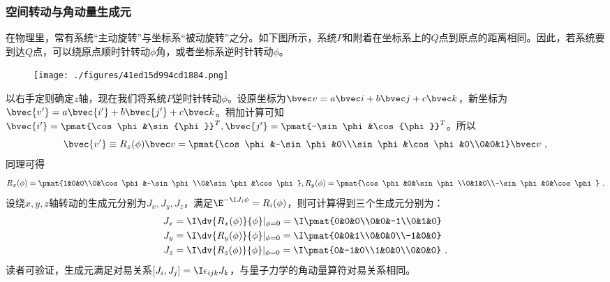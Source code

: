 
\begin{issues}
\issueMissDepend
\issueTODO
\end{issues}

\subsubsection{空间转动与角动量生成元}
在物理里，常有系统“主动旋转”与坐标系“被动旋转”之分。如下图所示，系统$P$和附着在坐标系上的$Q$点到原点的距离相同。因此，若系统要到达$Q$点，可以绕原点顺时针转动$\phi$角，或者坐标系逆时针转动$\phi$。
\begin{figure}[ht]
\centering
\texttt{[image: ./figures/41ed15d994cd1884.png]}
\caption{} \label{fig_spinqm_1}
\end{figure}
以右手定则确定$z$轴，现在我们将系统$P$逆时针转动$\phi$。设原坐标为$\bvec v=a\bvec i+b\bvec j+c\bvec k$，新坐标为$\bvec {v'}=a\bvec {i'}+b\bvec {j'}+c\bvec k$。稍加计算可知$\bvec {i'}=\pmat{\cos \phi &\sin {\phi}}^T,\bvec {j'}=\pmat{-\sin \phi &\cos {\phi}}^T$。所以
\begin{equation}
\bvec{v'}\equiv R_z(\phi)\bvec v=\pmat{\cos\phi&-\sin\phi&0\\\sin\phi&\cos \phi&0\\0&0&1}\bvec v~,
\end{equation}
同理可得
\begin{equation}
R_x(\phi)=\pmat {1&0&0\\0&\cos\phi&-\sin\phi\\0&\sin\phi&\cos\phi},R_y(\phi)=\pmat {\cos\phi&0&\sin\phi\\0&1&0\\-\sin\phi&0&\cos\phi}~.
\end{equation}
设绕$x,y,z$轴转动的生成元分别为$J_x,J_y,J_z$，满足$\E^{-\I J_i\phi}=R_i(\phi)$，则可计算得到三个生成元分别为：
\begin{equation}
\begin{aligned}
J_x&=\I \dv{R_x(\phi)}{\phi}|_{\phi=0}=\I \pmat{0&0&0\\0&0&-1\\0&1&0}\\
J_y&=\I \dv{R_y(\phi)}{\phi}|_{\phi=0}=\I\pmat{0&0&1\\0&0&0\\-1&0&0}\\
J_z&=\I \dv{R_z(\phi)}{\phi}|_{\phi=0}=\I\pmat{0&-1&0\\1&0&0\\0&0&0}~.
\end{aligned}
\end{equation}
读者可验证，生成元满足对易关系$[J_i,J_j]=\I\epsilon_{ijk}J_k$，与量子力学的角动量算符对易关系相同。


